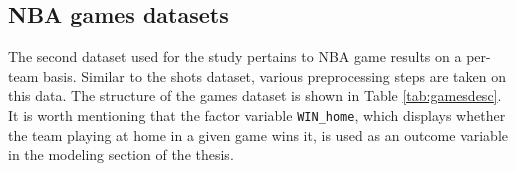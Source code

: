 \documentclass[
  12pt,
  a4paper,
]{article}
\begin{document}
\hypertarget{nba-games-datasets}{%
\subsection{NBA games datasets}\label{nba-games-datasets}}

The second dataset used for the study pertains to NBA game results on a per-team basis. Similar to the shots dataset, various preprocessing steps are taken on this data. The structure of the games dataset is shown in Table \ref{tab:gamesdesc}. It is worth mentioning that the factor variable \texttt{WIN\_home}, which displays whether the team playing at home in a given game wins it, is used as an outcome variable in the modeling section of the thesis.

\begin{table}[H]


\end{table}
\end{document}
